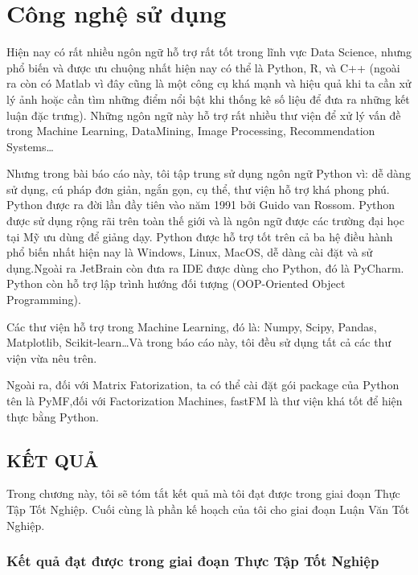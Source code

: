 \documentclass[a4paper,12pt,numbered,print,index,custombib, oneside, custommargin]{report}
\begin{document}
\part{Công nghệ sử dụng}
Hiện nay có rất nhiều ngôn ngữ hỗ trợ rất tốt trong lĩnh vực Data Science, nhưng phổ biến và được ưu chuộng nhất hiện nay có thể là Python, R, và C++ (ngoài ra còn có Matlab vì đây cũng là một công cụ khá mạnh và hiệu quả khi ta cần xử lý ảnh hoặc cần tìm những điểm nổi bật khi thống kê số liệu để đưa ra những kết luận đặc trưng). Những ngôn ngữ này hỗ trợ rất nhiều thư viện để xử lý vấn đề trong Machine Learning, DataMining, Image Processing, Recommendation Systems…		\par
Nhưng trong bài báo cáo này, tôi tập trung sử dụng ngôn ngữ Python vì: dễ dàng sử dụng, cú pháp đơn giản, ngắn gọn, cụ thể, thư viện hỗ trợ khá phong phú. Python được ra đời lần đầy tiên vào năm 1991 bởi Guido van Rossom. Python được sử dụng rộng rãi trên toàn thế giới và là ngôn ngữ được các trường đại học tại Mỹ ưu dùng để giảng dạy. Python được hỗ trợ tốt trên cả ba hệ điều hành phổ biến nhất hiện nay là Windows, Linux, MacOS, dễ dàng cài đặt và sử dụng.Ngoài ra JetBrain còn đưa ra IDE được dùng cho Python, đó là PyCharm. Python còn hỗ trợ lập trình hướng đối tượng (OOP-Oriented Object Programming). \par 
Các thư viện hỗ trợ trong Machine Learning, đó là: Numpy, Scipy, Pandas, Matplotlib, Scikit-learn…Và trong báo cáo này, tôi đều sử dụng tất cả các thư viện vừa nêu trên.	\par
Ngoài ra, đối với Matrix Fatorization, ta có thể cài đặt gói package của Python tên là PyMF,đối với Factorization Machines, fastFM là thư viện khá tốt để hiện thực bằng Python.	\par
%
%

\chapter{KẾT QUẢ}

Trong chương này, tôi sẽ tóm tắt kết quả mà tôi đạt được trong giai đoạn Thực Tập Tốt Nghiệp. Cuối cùng là phần kế hoạch của tôi cho giai đoạn Luận Văn Tốt Nghiệp.

\section{Kết quả đạt được trong giai đoạn Thực Tập Tốt Nghiệp}
\end{document}
